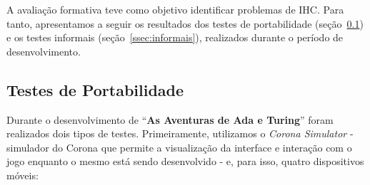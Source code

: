 A avaliação formativa teve como objetivo identificar problemas de \acrshort{IHC}. Para tanto, apresentamos a seguir os resultados dos testes de portabilidade (seção~\ref{ssec:testes_portabilidade}) e os testes informais (seção~\ref{ssec:informais}), realizados durante o período de desenvolvimento.

\subsection{Testes de Portabilidade} \label{ssec:testes_portabilidade}

Durante o desenvolvimento de “\textbf{As Aventuras de Ada e Turing}” foram realizados dois tipos de testes. Primeiramente, utilizamos o \textit{Corona Simulator} - simulador do Corona que permite a visualização da interface e interação com o jogo enquanto o mesmo está sendo desenvolvido - e, para isso, quatro dispositivos móveis:


